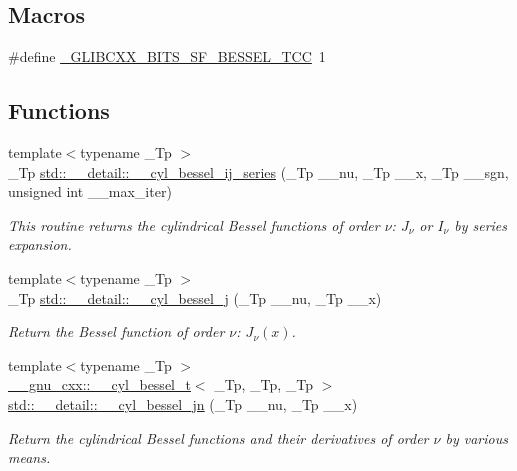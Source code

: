 \subsection*{Macros}
\begin{DoxyCompactItemize}
\item 
\#define \hyperlink{sf__bessel_8tcc_abd320ef9965fd609102634f0c12d2682}{\+\_\+\+G\+L\+I\+B\+C\+X\+X\+\_\+\+B\+I\+T\+S\+\_\+\+S\+F\+\_\+\+B\+E\+S\+S\+E\+L\+\_\+\+T\+CC}~1
\end{DoxyCompactItemize}
\subsection*{Functions}
\begin{DoxyCompactItemize}
\item 
{\footnotesize template$<$typename \+\_\+\+Tp $>$ }\\\+\_\+\+Tp \hyperlink{namespacestd_1_1____detail_a8b52f1f93a90b9ed2504521e0ea440f5}{std\+::\+\_\+\+\_\+detail\+::\+\_\+\+\_\+cyl\+\_\+bessel\+\_\+ij\+\_\+series} (\+\_\+\+Tp \+\_\+\+\_\+nu, \+\_\+\+Tp \+\_\+\+\_\+x, \+\_\+\+Tp \+\_\+\+\_\+sgn, unsigned int \+\_\+\+\_\+max\+\_\+iter)
\begin{DoxyCompactList}\small\item\em This routine returns the cylindrical Bessel functions of order $ \nu $\+: $ J_{\nu} $ or $ I_{\nu} $ by series expansion. \end{DoxyCompactList}\item 
{\footnotesize template$<$typename \+\_\+\+Tp $>$ }\\\+\_\+\+Tp \hyperlink{namespacestd_1_1____detail_a9909fc0c463a7f0b9259fe02e15fce55}{std\+::\+\_\+\+\_\+detail\+::\+\_\+\+\_\+cyl\+\_\+bessel\+\_\+j} (\+\_\+\+Tp \+\_\+\+\_\+nu, \+\_\+\+Tp \+\_\+\+\_\+x)
\begin{DoxyCompactList}\small\item\em Return the Bessel function of order $ \nu $\+: $ J_{\nu}(x) $. \end{DoxyCompactList}\item 
{\footnotesize template$<$typename \+\_\+\+Tp $>$ }\\\hyperlink{struct____gnu__cxx_1_1____cyl__bessel__t}{\+\_\+\+\_\+gnu\+\_\+cxx\+::\+\_\+\+\_\+cyl\+\_\+bessel\+\_\+t}$<$ \+\_\+\+Tp, \+\_\+\+Tp, \+\_\+\+Tp $>$ \hyperlink{namespacestd_1_1____detail_ae70ea3200a43241a3c6a73d3aa2dc1cc}{std\+::\+\_\+\+\_\+detail\+::\+\_\+\+\_\+cyl\+\_\+bessel\+\_\+jn} (\+\_\+\+Tp \+\_\+\+\_\+nu, \+\_\+\+Tp \+\_\+\+\_\+x)
\begin{DoxyCompactList}\small\item\em Return the cylindrical Bessel functions and their derivatives of order $ \nu $ by various means. \end{DoxyCompactList}\item 

\end{DoxyCompactItemize}
